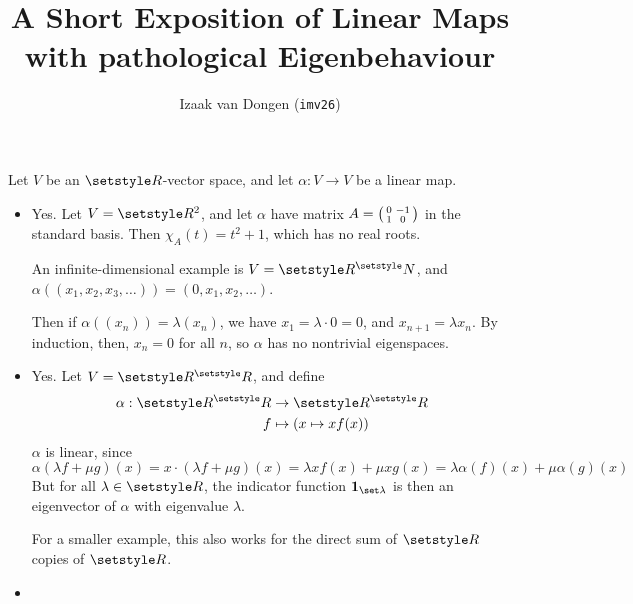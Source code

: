 \documentclass[fleqn,a4paper,11pt]{article}
\title{A Short Exposition of Linear Maps with pathological Eigenbehaviour}
\author{\texorpdfstring{Izaak van Dongen (\texttt{imv26})}
                       {Izaak van Dongen (imv26)}}
\date{}
\begin{document}
\maketitle

Let \(V\) be an \(\R\)-vector space, and let \(\alpha: V \to V\) be a linear
map.
\begin{itemize}
 \item

  Yes. Let \(V = \R^2\), and let \(\alpha\) have matrix
  \(A = \begin{psmallmatrix} 0 & -1 \\ 1 & 0 \end{psmallmatrix}\) in the standard
  basis. Then \(\chi_A(t) = t^2 + 1\), which has no real roots.

  An infinite-dimensional example is \(V = \R^\N\), and
  \(\alpha((x_1, x_2, x_3, \dotsc)) = (0, x_1, x_2, \dotsc)\).

  Then if \(\alpha((x_n)) = \lambda (x_n)\), we have
  \(x_1 = \lambda \cdot 0 = 0\), and
  \(x_{n + 1} = \lambda x_n\). By induction, then, \(x_n = 0\) for all \(n\), so
  \(\alpha\) has no nontrivial eigenspaces.
 \item

  Yes. Let \(V = \R^\R\), and define
  \begin{align*}
   \alpha: \R^\R &\to \R^\R \\
               f &\mapsto (x \mapsto x f(x))
  \end{align*}
  \(\alpha\) is linear, since
  \begin{equation*}
   \alpha(\lambda f + \mu g)(x)
    = x \cdot (\lambda f + \mu g)(x)
    = \lambda x f(x) + \mu x g(x)
    = \lambda \alpha(f)(x) + \mu \alpha(g)(x)
  \end{equation*}
  But for all \(\lambda \in \R\), the indicator function
  \(\mathbf 1_{\set\lambda}\) is then an eigenvector of \(\alpha\) with
  eigenvalue \(\lambda\).

  For a smaller example, this also works for the direct sum of
  \(\R\) copies of \(\R\).
 \item


\end{itemize}
\end{document}
